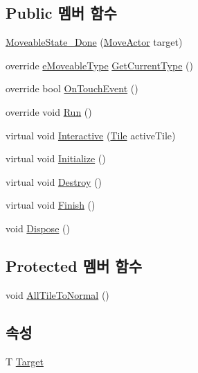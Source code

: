 \subsection*{Public 멤버 함수}
\begin{DoxyCompactItemize}
\item 
\hyperlink{class_move_actor_1_1_moveable_state___done_a8b73826d5877926a1f85284745a76501}{Moveable\+State\+\_\+\+Done} (\hyperlink{class_move_actor}{Move\+Actor} target)
\item 
override \hyperlink{_move_actor_8cs_a90215797ba850e199f3ef63d7c56f132}{e\+Moveable\+Type} \hyperlink{class_move_actor_1_1_moveable_state___done_a47001b558c490b2c1801e49beb44d56e}{Get\+Current\+Type} ()
\item 
override bool \hyperlink{class_move_actor_1_1_moveable_state___done_a2348091ee75e4a71a563b1e5c6d38267}{On\+Touch\+Event} ()
\item 
override void \hyperlink{class_move_actor_1_1_moveable_state___done_a5fa0f074185fecf42c07697b3bf9ab2c}{Run} ()
\item 
virtual void \hyperlink{class_move_actor_1_1_moveable_state_a2e7b5112230caf5048b95cbdc6b96e34}{Interactive} (\hyperlink{class_tile}{Tile} active\+Tile)
\item 
virtual void \hyperlink{class_m_c_n_1_1_state_a8eabaffe047e6dccd5c5d8aed7bf218a}{Initialize} ()
\item 
virtual void \hyperlink{class_m_c_n_1_1_state_a32af22a6a0a979d3b3a80225426aa839}{Destroy} ()
\item 
virtual void \hyperlink{class_m_c_n_1_1_state_a6de4f94b23916fcd05f589759da9ac3f}{Finish} ()
\item 
void \hyperlink{class_m_c_n_1_1_state_a6c53b2eda47e718ff469fd76a95cf02a}{Dispose} ()
\end{DoxyCompactItemize}
\subsection*{Protected 멤버 함수}
\begin{DoxyCompactItemize}
\item 
void \hyperlink{class_move_actor_1_1_moveable_state_a2da1a565b497b15a220f5ff494ec7a1e}{All\+Tile\+To\+Normal} ()
\end{DoxyCompactItemize}
\subsection*{속성}
\begin{DoxyCompactItemize}
\item 
T \hyperlink{class_m_c_n_1_1_state_a93ba2fd920292031bd6e65b1dc505cb3}{Target}
\end{DoxyCompactItemize}


